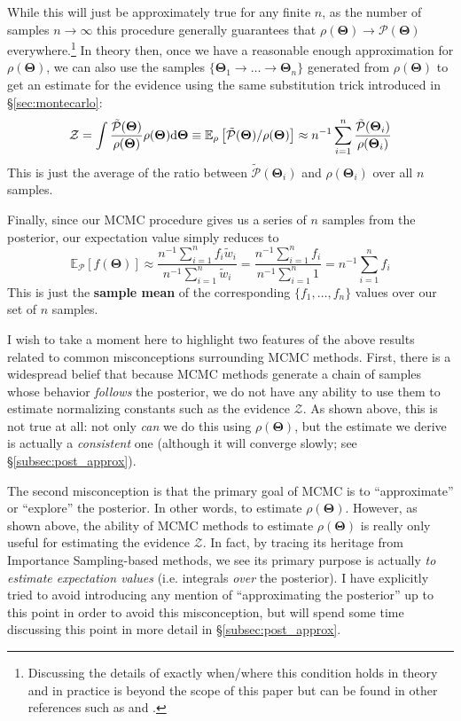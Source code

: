 \documentclass[12pt, titlepage]{article}
\newcommand{\deriv}{\ensuremath{{\rm d}}}  %
\newcommand{\meanwrt}[2]{\ensuremath{\mathbb{E}_{{#2}}\left[{#1}\right]}}
\newcommand{\params}{\ensuremath{\boldsymbol\Theta}}
\newcommand{\posterior}{\ensuremath{\mathcal{P}}}
\newcommand{\evidence}{\ensuremath{\mathcal{Z}}}
\begin{document}
While this will just be approximately true for any finite $n$,
as the number of samples $n \rightarrow \infty$ this procedure generally
guarantees that $\rho(\params) \rightarrow \posterior(\params)$ 
everywhere.\footnote{Discussing the details of exactly when/where this
condition holds in theory and in practice
is beyond the scope of this paper but can be found in
other references such as \citet{asmussenglynn11} and \citet{brooks+11}.}
In theory then, once we have a reasonable enough
approximation for $\rho(\params)$, we can also use the 
samples $\{ \params_1 \rightarrow \dots \rightarrow \params_n \}$
generated from $\rho(\params)$
to get an estimate for the evidence using the 
same substitution trick introduced in \S\ref{sec:montecarlo}:
\begin{align}
    \evidence
    = \int \frac{\tilde{\posterior}(\params)}{\rho(\params)}
    \rho(\params) \deriv \params
    \equiv \meanwrt{\tilde{\posterior}(\params)/\rho(\params)}{\rho}
    \approx n^{-1} \sum_{i=1}^{n} 
    \frac{\tilde{\posterior}(\params_i)}{\rho(\params_i)}
\end{align}
This is just the average of the ratio 
between $\tilde{\posterior}(\params_i)$ and $\rho(\params_i)$
over all $n$ samples.

Finally, since our MCMC procedure gives us a series of $n$
samples from the posterior, our expectation value simply reduces to
\begin{equation}
    \meanwrt{f(\params)}{\posterior} 
    \approx \frac{n^{-1} \sum_{i=1}^{n} f_i \tilde{w}_i}
    {n^{-1} \sum_{i=1}^{n} \tilde{w}_i}
    = \frac{n^{-1} \sum_{i=1}^{n} f_i}
    {n^{-1} \sum_{i=1}^{n} 1}
    = n^{-1} \sum_{i=1}^{n} f_i
\end{equation}
This is just the \textbf{sample mean} of
the corresponding $\{ f_1, \dots, f_n \}$ values over
our set of $n$ samples. 

I wish to take a moment here to highlight two features of the above results
related to common misconceptions surrounding MCMC methods. First, there
is a widespread belief that because MCMC methods generate a chain of 
samples whose behavior \textit{follows} the posterior, we do not
have any ability to use them to estimate normalizing constants such
as the evidence $\evidence$. As shown above, this is not true at all: not only
\textit{can} we do this using $\rho(\params)$, but the estimate we derive
is actually a \textit{consistent} one (although it will converge slowly;
see \S\ref{subsec:post_approx}).

The second misconception is that the primary goal of MCMC is to
``approximate'' or ``explore'' the posterior. In other words,
to estimate $\rho(\params)$. However, as shown above,
the ability of MCMC methods to estimate $\rho(\params)$
is really only useful for estimating the evidence $\evidence$. In fact, by tracing
its heritage from Importance Sampling-based methods, we see its primary purpose
is actually \textit{to estimate expectation values} (i.e.
integrals \textit{over} the posterior). I have explicitly tried to avoid
introducing any mention of ``approximating the posterior'' up to this point
in order to avoid this misconception, but will spend some time discussing
this point in more detail in \S\ref{subsec:post_approx}.
\end{document}

